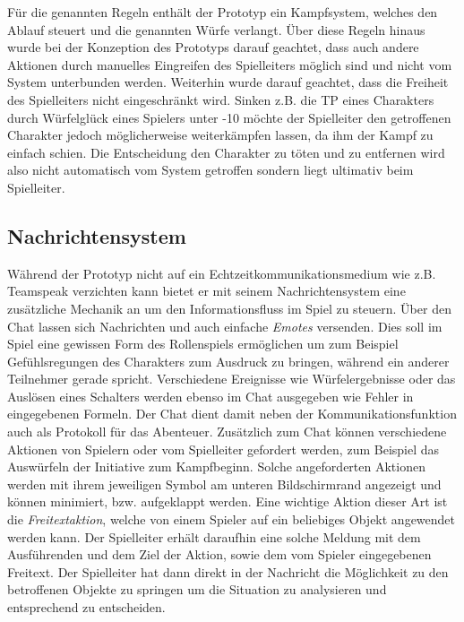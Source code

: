 Für die genannten Regeln enthält der Prototyp ein Kampfsystem, welches den Ablauf steuert und die genannten Würfe verlangt. Über diese Regeln hinaus wurde bei der Konzeption des Prototyps darauf geachtet, dass auch andere Aktionen durch manuelles Eingreifen des Spielleiters möglich sind und nicht vom System unterbunden werden. Weiterhin wurde darauf geachtet, dass die Freiheit des Spielleiters nicht eingeschränkt wird. Sinken z.B. die TP eines Charakters durch Würfelglück eines Spielers unter -10 möchte der Spielleiter den getroffenen Charakter jedoch möglicherweise weiterkämpfen lassen, da ihm der Kampf zu einfach schien. Die Entscheidung den Charakter zu töten und zu entfernen wird also nicht automatisch vom System getroffen sondern liegt ultimativ beim Spielleiter.




\subsection{Nachrichtensystem}
\label{sec:Nachrichtensystem}
Während der Prototyp nicht auf ein Echtzeitkommunikationsmedium wie z.B. Teamspeak verzichten kann bietet er mit seinem Nachrichtensystem eine zusätzliche Mechanik an um den Informationsfluss im Spiel zu steuern. 
Über den Chat lassen sich Nachrichten und auch einfache \emph{Emotes} versenden. Dies soll im Spiel eine gewissen Form des Rollenspiels ermöglichen um zum Beispiel Gefühlsregungen des Charakters zum Ausdruck zu bringen, während ein anderer Teilnehmer gerade spricht. Verschiedene Ereignisse wie Würfelergebnisse oder das Auslösen eines Schalters werden ebenso im Chat ausgegeben wie Fehler in eingegebenen Formeln. Der Chat dient damit neben der Kommunikationsfunktion auch als Protokoll für das Abenteuer.\newline
Zusätzlich zum Chat können verschiedene Aktionen von Spielern oder vom Spielleiter gefordert werden, zum Beispiel das Auswürfeln der Initiative zum Kampfbeginn. Solche angeforderten Aktionen werden mit ihrem jeweiligen Symbol am unteren Bildschirmrand angezeigt und können minimiert, bzw. aufgeklappt werden.\newline
Eine wichtige Aktion dieser Art ist die \emph{Freitextaktion}, welche von einem Spieler auf ein beliebiges Objekt angewendet werden kann. Der Spielleiter erhält daraufhin eine solche Meldung mit dem Ausführenden und dem Ziel der Aktion, sowie dem vom Spieler eingegebenen Freitext. Der Spielleiter hat dann direkt in der Nachricht die Möglichkeit zu den betroffenen Objekte zu springen um die Situation zu analysieren und entsprechend zu entscheiden.


